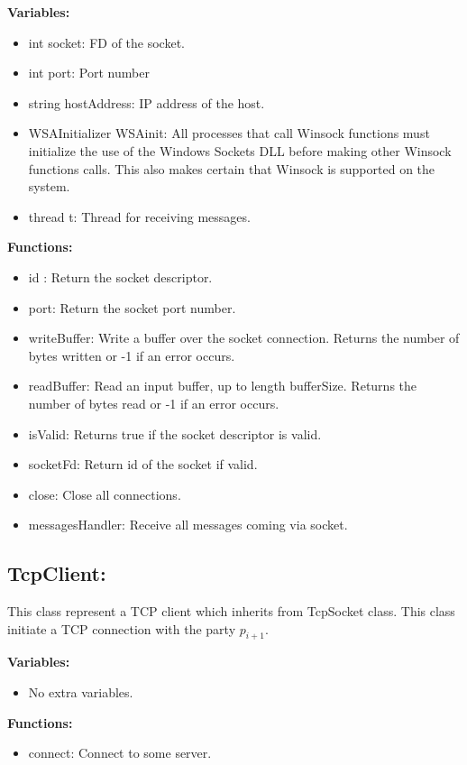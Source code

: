 \documentclass[12pt]{article}
\begin{document}
\textbf{Variables:}
\begin{itemize}
	\item int socket: FD of the socket.
	\item int port: Port number
	\item string hostAddress: IP address of the host.
	\item WSAInitializer WSAinit: All processes that call Winsock functions must initialize the use of the Windows Sockets DLL before making other Winsock functions calls. This also makes certain that Winsock is supported on the system.
	\item thread t: Thread for receiving messages.
\end{itemize}
\textbf{Functions:}
\begin{itemize}
	\item id : Return the socket descriptor.
	\item port: Return the socket port number.
	\item writeBuffer: Write a buffer over the socket connection.  Returns the number of bytes written or -1 if an error occurs.
	
	\item readBuffer: Read an input buffer, up to length bufferSize.  Returns the number of bytes read or -1 if an error occurs.
	
	\item isValid: Returns true if the socket descriptor is valid.
	\item socketFd: Return id of the socket if valid.
	\item close: Close all connections.
	\item messagesHandler: Receive all messages coming via socket.
\end{itemize}


\subsection{TcpClient:}
This class represent a TCP client which inherits from TcpSocket class. This class initiate a TCP connection with the party $p_{i+1}$.\hfill\break\hfill\break

\textbf{Variables:}\hfill\break
  \begin{itemize}
	\item No extra variables.
\end{itemize} \hfill\break
\textbf{Functions:}
\begin{itemize}
	\item connect: Connect to some server.
\end{itemize}
\end{document}
